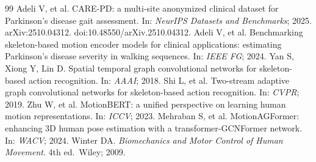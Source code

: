 \documentclass[preprint,12pt]{elsarticle}
\begin{document}
\begin{thebibliography}{99}
 Adeli V, et al. CARE-PD: a multi-site anonymized clinical dataset for Parkinson's disease gait assessment. In: \textit{NeurIPS Datasets and Benchmarks}; 2025. arXiv:2510.04312. doi:10.48550/arXiv.2510.04312.
 Adeli V, et al. Benchmarking skeleton-based motion encoder models for clinical applications: estimating Parkinson's disease severity in walking sequences. In: \textit{IEEE FG}; 2024.
 Yan S, Xiong Y, Lin D. Spatial temporal graph convolutional networks for skeleton-based action recognition. In: \textit{AAAI}; 2018.
 Shi L, et al. Two-stream adaptive graph convolutional networks for skeleton-based action recognition. In: \textit{CVPR}; 2019.
 Zhu W, et al. MotionBERT: a unified perspective on learning human motion representations. In: \textit{ICCV}; 2023.
 Mehraban S, et al. MotionAGFormer: enhancing 3D human pose estimation with a transformer-GCNFormer network. In: \textit{WACV}; 2024.
 Winter DA. \textit{Biomechanics and Motor Control of Human Movement}. 4th ed.\ Wiley; 2009.
\end{thebibliography}
\end{document}

